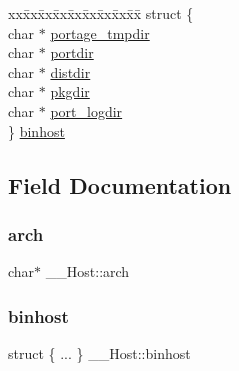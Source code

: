 \begin{DoxyCompactItemize}
\begin{tabbing}
\end{tabbing}\item 
\begin{tabbing}
xx\=xx\=xx\=xx\=xx\=xx\=xx\=xx\=xx\=\kill
struct \{\\
\>char $\ast$ \mbox{\hyperlink{struct_____host_a40e40d3bc778b8f73c312edd7c4c36a8}{portage\_tmpdir}}\\
\>char $\ast$ \mbox{\hyperlink{struct_____host_ac4e7738b691197122d5f18069425933a}{portdir}}\\
\>char $\ast$ \mbox{\hyperlink{struct_____host_ad108845535e7ae4801e939319b208e52}{distdir}}\\
\>char $\ast$ \mbox{\hyperlink{struct_____host_af2be365c35b8cd256780212154c5e639}{pkgdir}}\\
\>char $\ast$ \mbox{\hyperlink{struct_____host_a8d9d6cea205f5bdb44284aafb41b9266}{port\_logdir}}\\
\} \mbox{\hyperlink{struct_____host_adde139e84a9a3722fee6faab0978568f}{binhost}}\\

\end{tabbing}\end{DoxyCompactItemize}


\subsection{Field Documentation}
\mbox{\label{struct_____host_a781364a501280f6632f702fc1dceb8e4}} 
\subsubsection{\texorpdfstring{arch}{arch}}
{\footnotesize\ttfamily char$\ast$ \+\_\+\+\_\+\+Host\+::arch}

\mbox{\label{struct_____host_adde139e84a9a3722fee6faab0978568f}} 
\subsubsection{\texorpdfstring{binhost}{binhost}}
{\footnotesize\ttfamily struct \{ ... \}   \+\_\+\+\_\+\+Host\+::binhost}

\mbox{\label{struct_____host_a94121a0033331d7cdf5425e6d97a74ca}} 
